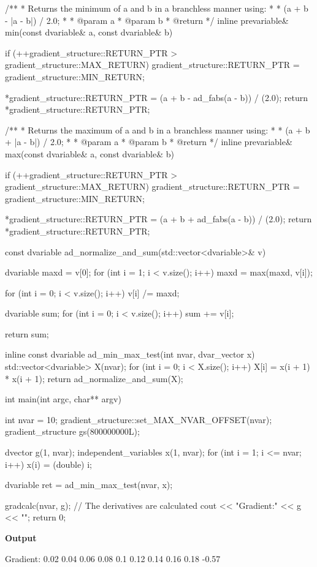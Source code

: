 \documentclass[oneside]{article}
\begin{document}
\begin{cppsource}
/**
 * Returns the minimum of a and b in a branchless manner using:
 *
 * (a + b - |a - b|) / 2.0;
 *
 * @param a
 * @param b
 * @return
 */
inline prevariable& min(const dvariable& a, const dvariable& b) {
    if (++gradient_structure::RETURN_PTR > gradient_structure::MAX_RETURN)
        gradient_structure::RETURN_PTR = gradient_structure::MIN_RETURN;

    *gradient_structure::RETURN_PTR = (a + b - ad_fabs(a - b)) / (2.0);
    return *gradient_structure::RETURN_PTR;
}

/**
 * Returns the maximum of a and b in a branchless manner using:
 *
 * (a + b + |a - b|) / 2.0;
 *
 * @param a
 * @param b
 * @return
 */
inline prevariable& max(const dvariable& a, const dvariable& b) {
    if (++gradient_structure::RETURN_PTR > gradient_structure::MAX_RETURN)
        gradient_structure::RETURN_PTR = gradient_structure::MIN_RETURN;

    *gradient_structure::RETURN_PTR = (a + b + ad_fabs(a - b)) / (2.0);
    return *gradient_structure::RETURN_PTR;
}

const dvariable ad_normalize_and_sum(std::vector<dvariable>& v) {
    dvariable maxd = v[0];
    for (int i = 1; i < v.size(); i++) {
        maxd = max(maxd, v[i]);
    }

    for (int i = 0; i < v.size(); i++) {
        v[i] /= maxd;
    }

    dvariable sum;
    for (int i = 0; i < v.size(); i++) {
        sum += v[i];
    }

    return sum;
}
\end{cppsource}

\begin{cppsource}
inline const dvariable ad_min_max_test(int nvar, dvar_vector x) {
    std::vector<dvariable> X(nvar);
    for (int i = 0; i < X.size(); i++) {
        X[i] = x(i + 1) * x(i + 1);
    }
    return ad_normalize_and_sum(X);
}

int main(int argc, char** argv) {

    int nvar = 10;
    gradient_structure::set_MAX_NVAR_OFFSET(nvar);
    gradient_structure gs(800000000L);

    dvector g(1, nvar);
    independent_variables x(1, nvar);
    for (int i = 1; i <= nvar; i++) {
        x(i) = (double) i;
    }

    dvariable ret = ad_min_max_test(nvar, x);

    gradcalc(nvar, g); // The derivatives are calculated
    cout << "Gradient:\n" << g << "\n";
    return 0;
}
\end{cppsource}

\textbf{Output}
\begin{myoutput}
Gradient:
0.02 0.04 0.06 0.08 0.1 0.12 0.14 0.16 0.18 -0.57
\end{myoutput}
\end{document}
